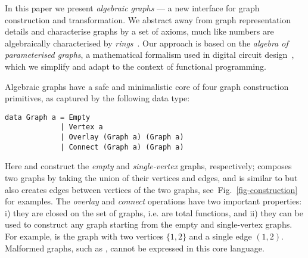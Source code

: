 In this paper we present \emph{algebraic graphs} --- a new interface
for graph construction and transformation. We abstract away from graph representation
details and characterise graphs by a set of axioms, much like numbers are algebraically
characterised by \emph{rings}~\cite{1999_maclane_algebra}. Our approach is based on
the \emph{algebra of parameterised graphs}, a mathematical formalism used in digital
circuit design~\cite{2014_algebra_mokhov}, which we simplify and adapt to the context
of functional programming.

Algebraic graphs have a safe and minimalistic core of four graph construction primitives,
as captured by the following data type:

\begin{verbatim}
data Graph a = Empty
             | Vertex a
             | Overlay (Graph a) (Graph a)
             | Connect (Graph a) (Graph a)
\end{verbatim}

\noindent
Here  and  construct the \emph{empty} and \emph{single-vertex} graphs,
respectively;  composes two graphs by taking the union of their vertices and
edges, and  is similar to  but also creates edges between vertices
of the two graphs, see~Fig.~\ref{fig-construction} for examples. The \emph{overlay} and
\emph{connect} operations have two important properties:
i) they are closed on the set of graphs, i.e. are total functions, and ii) they can be used
to construct any graph starting from the empty and single-vertex graphs.
For example,  is the graph with two vertices $\{1,2\}$
and a single edge $(1,2)$. Malformed graphs, such as , cannot be
expressed in this core language.

